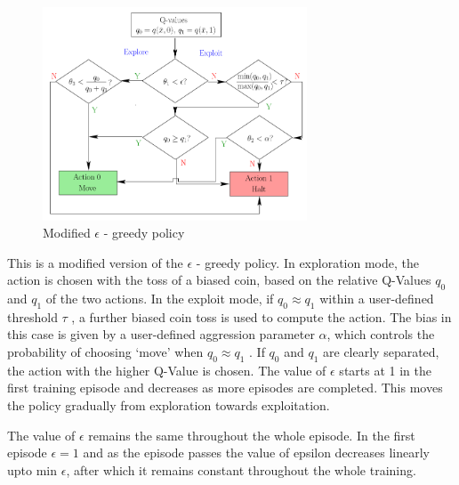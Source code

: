 \begin{figure}[h]
    \centering
    \includegraphics[width=0.7\textwidth]{policy}
    \caption{ Modified $ \epsilon$ - greedy policy \cite{ARTICLE:1}  }
    \label{image-myimage20}
\end{figure}

This is a modified version of the $\epsilon$ - greedy policy.
In exploration mode, the action is chosen with the
toss of a biased coin, based on the relative Q-Values $q_0$ and $q_1$
of the two actions. In the exploit mode, if $q_0 \approx q_1$
within a user-defined threshold $\tau$ , a further biased coin toss
is used to compute the action. The bias in this case is given
by a user-defined aggression parameter $\alpha$, which controls the
probability of choosing ‘move’ when $q_0 \approx q_1$ . If $q_0$ and $q_1$
are clearly separated, the action with the higher Q-Value is
chosen. The value of $\epsilon$ starts at 1 in the first training episode
and decreases as more episodes are completed. This moves
the policy gradually from exploration towards exploitation.

\vspace{\baselineskip}

The value of $\epsilon$ remains the same throughout the whole episode. In the first episode 
$\epsilon = 1$ and as the episode passes the value of epsilon decreases linearly upto min $\epsilon$,
after which it remains constant throughout the whole training.

